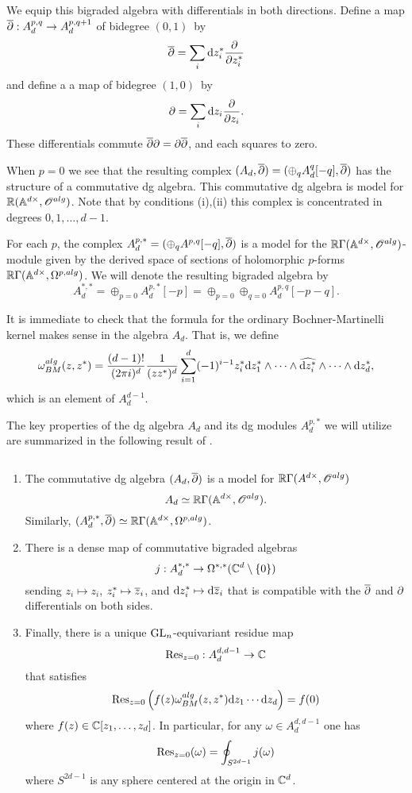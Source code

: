 We equip this bigraded algebra with differentials in both directions.
Define a map $\dbar : A_d^{p,q} \to A_d^{p,q+1}$ of bidegree $(0,1)$~by
\[
\dbar = \sum_i \d z^*_i \frac{\partial}{\partial z_i^*}
\]
and define a a map of bidegree $(1,0)$~by
\[
\partial = \sum_i \d z_i \frac{\partial}{\partial z_i} .
\]
These differentials commute $\dbar \partial = \partial \dbar$, and each squares to zero.

When $p=0$ we see that the resulting complex $(A_d, \dbar) = (\oplus_q A_d^{q}[-q], \dbar)$ has the structure of a commutative dg algebra.
This commutative dg algebra is model for $\RR(\AA^{d \times}, \sO^{alg})$.
Note that by conditions (i),(ii) this complex is concentrated in degrees $0,1,\ldots,d-1$. 

For each $p$, the complex $A^{p,*}_d = (\oplus_q A^{p,q}[-q], \dbar)$ is a model for the $\RR \Gamma( \AA^{d\times}, \sO^{alg})$-module given by the derived space of sections of holomorphic $p$-forms $\RR \Gamma(\AA^{d\times}, \Omega^{p,alg})$. 
We will denote the resulting bigraded algebra by
\[
A_d^{*,*} = \oplus_{p = 0} A_d^{p,*}[-p] = \oplus_{p=0} \oplus_{q=0} A^{p,q}_d [-p-q] .
\]

It is immediate to check that the formula for the ordinary Bochner-Martinelli kernel makes sense in the algebra $A_d$.
That is, we define
\[
\omega_{BM}^{alg} (z,z^*) = \frac{(d-1)!}{(2 \pi i)^d} \frac{1}{(zz^*)^d} \sum_{i=1}^d (-1)^{i-1} z_i^* \d z_1^* \wedge \cdots \wedge \Hat{\d z_i^*} \wedge \cdots \wedge \d z_d^*,
\]
which is an element of $A_d^{d-1}$. 

The key properties of the dg algebra $A_d$ and its dg modules $A_{d}^{p,*}$ we will utilize are summarized in the following result of \cite{FHK}.

\begin{prop}\label{prop: Ad} $\;$
\begin{enumerate}
\item
The commutative dg algebra $(A_d,\dbar)$ is a model for $\RR \Gamma(A^{d\times}, \sO^{alg})$
\[
A_d \simeq \RR\Gamma(\AA^{d \times}, \sO^{alg}) .
\]
Similarly, $(A_d^{p,*},\dbar) \simeq \RR \Gamma(\AA^{d\times}, \Omega^{p,alg})$.
\item There is a dense map of commutative bigraded algebras
\[
j : A^{*,*}_d \to \Omega^{*,*}(\CC^d \setminus \{0\}) 
\]
sending $z_i \mapsto z_i$, $z_i^* \mapsto \Bar{z}_i$, and $\d z_i^* \mapsto \d \zbar_i$ that is compatible with the $\dbar$ and $\partial$ differentials on both sides.
\item Finally, there is a unique $\GL_n$-equivariant residue map
\[
{\rm Res}_{z=0} : A_d^{d,d-1} \to \CC
\]
that satisfies
\[
\Res_{z=0} \left(f(z) \omega_{BM}^{alg}(z,z^*) \d z_1 \cdots \d z_d\right) = f(0)
\]
where $f (z) \in \CC[z_1,\ldots,z_d]$. 
In particular, for any $\omega \in A^{d,d-1}_d$ one has
\[
{\rm Res}_{z=0} (\omega) = \oint_{S^{2d-1}} j(\omega)
\]
where $S^{2d-1}$ is any sphere centered at the origin in $\CC^d$. 
\end{enumerate}
\end{prop}



